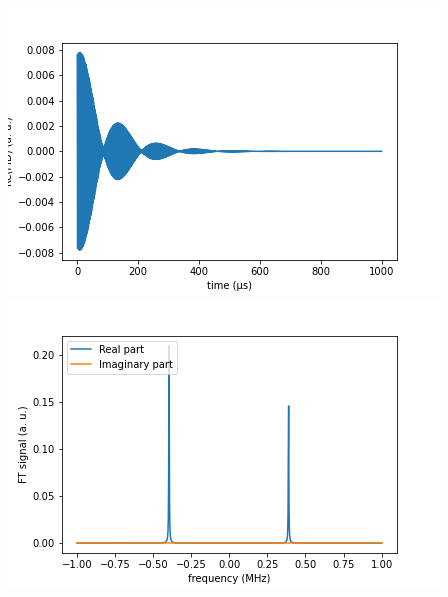 \documentclass[10pt]{beamer}
\begin{document}
\begin{frame}
\begin{columns}[T]
\begin{column}{.5\textwidth}
\begin{column}{.5\textwidth}
\end{column}
\end{column}
\begin{column}{.5\textwidth}
\includegraphics[width=\textwidth]{./spin1-2/12uncorrelated_mixed_dipD2/FIDSignal.png}
\includegraphics[width=\textwidth]{./spin1-2/12uncorrelated_mixed_dipD2/FTSignal.png}
\end{column}
\end{columns}
\end{frame}
\end{document}
